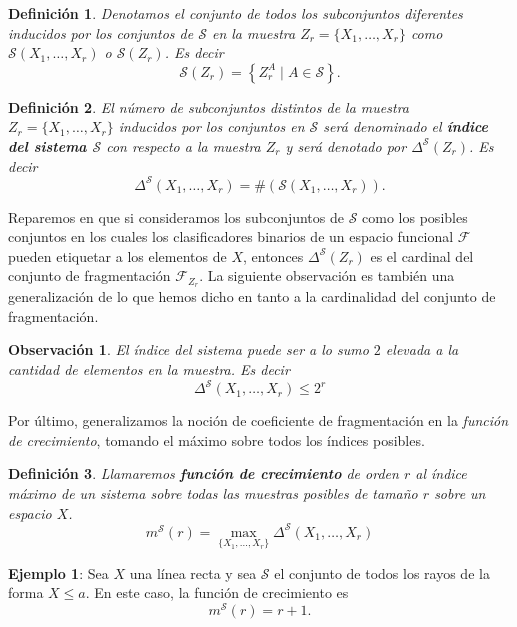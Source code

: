 \documentclass{report}
\newtheorem{dfn}{Definición}[subsection]
\newtheorem{obs}{Observación}[subsection]
\begin{document}
\begin{dfn}
Denotamos el conjunto de todos los subconjuntos diferentes inducidos por los 
conjuntos de \( \mathcal{S} \) en la muestra \( Z_r = \{X_1, \dots, X_r\} \) como \( \mathcal{S}(X_1, \dots, X_r) \) 
o \( \mathcal{S}(Z_r) \). Es decir
\[
    \mathcal{S}(Z_r) =  \left\{Z_r^A \mid A \in \mathcal{S}\right\}.
\]
\end{dfn}
\bigskip

\begin{dfn}
El número de subconjuntos distintos de la muestra \( Z_r = \{X_1, \dots, X_r\} \) 
inducidos por los conjuntos en \( \mathcal{S} \) será denominado el \textbf{índice 
del sistema \( \mathcal{S} \)} con respecto a la muestra \( Z_r \) 
y será denotado por $\Delta^{\mathcal{S}}(Z_r)$. Es decir
\[
\Delta^{\mathcal{S}}(X_1, \dots, X_r) = \#\left(\mathcal{S}(X_1, \dots, X_r)\right).
\]
\end{dfn}

Reparemos en que si consideramos los subconjuntos de $\mathcal{S}$ como los posibles conjuntos en
los cuales los clasificadores binarios de un espacio funcional $\mathcal{F}$ pueden etiquetar a los
elementos de $X$, entonces $\Delta^{\mathcal{S}}(Z_r)$ es el cardinal del conjunto de fragmentación $\mathcal{F}_{Z_r}$.
La siguiente observación es también una generalización
de lo que hemos dicho en tanto a la cardinalidad del conjunto de fragmentación.\newline


\begin{obs} El índice del sistema puede ser a lo sumo $2$ elevada a la cantidad de elementos en la muestra. Es decir
\[
    \Delta^{\mathcal{S}}(X_1, \dots, X_r) \leq 2^r
\]
\end{obs}

Por último, generalizamos la noción de coeficiente de fragmentación en la \textit{función de crecimiento},
tomando el máximo sobre todos los índices posibles.\newline

\begin{dfn}
    Llamaremos \textbf{función de crecimiento} de orden $r$ al índice máximo de un sistema sobre todas las muestras
    posibles de tamaño $r$ sobre un espacio $X$. 
    \[
    m^{\mathcal{S}}(r) = \max_{\{X_1,\dots,X_r\}}\Delta^{\mathcal{S}}(X_1,\dots,X_r)
    \]
\end{dfn}
\bigskip

\textbf{Ejemplo 1}: Sea \( X \) una línea recta y sea \( \mathcal{S} \) el conjunto 
de todos los rayos de la forma \( X \leq a \). En este caso, la función de crecimiento es  
\[
m^{\mathcal{S}}(r) = r + 1.
\]
\end{document}
